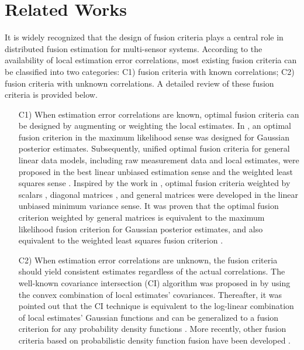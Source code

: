 \section{Related Works}
It is widely recognized that the design of fusion criteria plays a central role in distributed fusion estimation for multi-sensor systems. According to the availability of local estimation error correlations, most existing fusion criteria can be classified into two categories: C1) fusion criteria with known correlations; C2) fusion criteria with unknown correlations. A detailed review of these fusion criteria is provided below.
	\begin{itemize}
		\item[C1)] When estimation error correlations are known, optimal fusion criteria can be designed by augmenting or weighting the local estimates. In \cite{kim1994development}, an optimal fusion criterion in the maximum likelihood sense was designed for Gaussian posterior estimates. Subsequently, unified optimal fusion criteria for general linear data models, including raw measurement data and local estimates, were proposed in the best linear unbiased estimation sense and the weighted least squares sense \cite{li2003optimal}. Inspired by the work in \cite{kim1994development}, optimal fusion criteria weighted by scalars \cite{sun2005distributed}, diagonal matrices \cite{sun2004multisensora}, and general matrices \cite{sun2004multisensor} were developed in the linear unbiased minimum variance sense. It was proven that the optimal fusion criterion weighted by general matrices \cite{sun2004multisensora} is equivalent to the maximum likelihood fusion criterion \cite{kim1994development} for Gaussian posterior estimates, and also equivalent to the weighted least squares fusion criterion \cite{li2003optimal}.
		\item[C2)] When estimation error correlations are unknown, the fusion criteria should yield consistent estimates regardless of the actual correlations. The well-known covariance intersection (CI) algorithm was proposed in \cite{julier1997nondivergent} by using the convex combination of local estimates' covariances. Thereafter, it was pointed out that the CI technique is equivalent to the log-linear combination of local estimates' Gaussian functions and can be generalized to a fusion criterion for any probability density functions \cite{mahler2000optimal, hurley2002information, julier2006using, clark2010robust}. More recently, other fusion criteria based on probabilistic density function fusion have been developed \cite{koliander2022fusion, beekman2020review}.
	\end{itemize}
	
